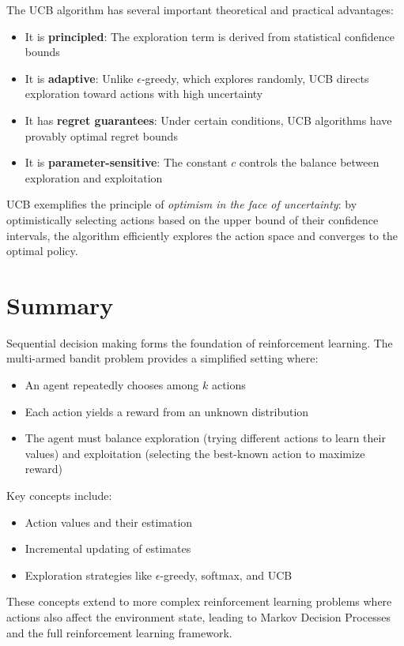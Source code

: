 \documentclass{article}
\begin{document}
The UCB algorithm has several important theoretical and practical advantages:

\begin{itemize}
    \item It is \textbf{principled}: The exploration term is derived from statistical confidence bounds
    \item It is \textbf{adaptive}: Unlike $\epsilon$-greedy, which explores randomly, UCB directs exploration toward actions with high uncertainty
    \item It has \textbf{regret guarantees}: Under certain conditions, UCB algorithms have provably optimal regret bounds
    \item It is \textbf{parameter-sensitive}: The constant $c$ controls the balance between exploration and exploitation
\end{itemize}

UCB exemplifies the principle of \textit{optimism in the face of uncertainty}: by optimistically selecting actions based on the upper bound of their confidence intervals, the algorithm efficiently explores the action space and converges to the optimal policy.

\section{Summary}
Sequential decision making forms the foundation of reinforcement learning. The multi-armed bandit problem provides a simplified setting where:

\begin{itemize}
    \item An agent repeatedly chooses among $k$ actions
    \item Each action yields a reward from an unknown distribution
    \item The agent must balance exploration (trying different actions to learn their values) and exploitation (selecting the best-known action to maximize reward)
\end{itemize}

Key concepts include:
\begin{itemize}
    \item Action values and their estimation
    \item Incremental updating of estimates
    \item Exploration strategies like $\epsilon$-greedy, softmax, and UCB
\end{itemize}

These concepts extend to more complex reinforcement learning problems where actions also affect the environment state, leading to Markov Decision Processes and the full reinforcement learning framework.
\end{document}

